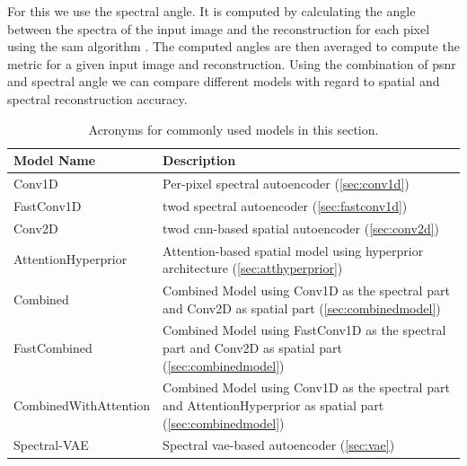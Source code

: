 For this we use the spectral angle. It is computed by calculating the angle between the spectra of the input image and the reconstruction for each pixel using the \ac{sam} algorithm \citep{kruse_spectral_1993}. The computed angles are then averaged to compute the metric for a given input image and reconstruction. Using the combination of \ac{psnr} and spectral angle we can compare different models with regard to spatial and spectral reconstruction accuracy.
\begin{table}
\centering
\caption{Acronyms for commonly used models in this section.}
\begin{tabularx}{\textwidth}{|L|L|}
\hline
Model Name & Description \\
\hline\hline
Conv1D & Per-pixel spectral autoencoder (\autoref{sec:conv1d})\\
\hline
FastConv1D & \Ac{twod} spectral autoencoder (\autoref{sec:fastconv1d})\\
\hline
Conv2D & \Ac{twod} \ac{cnn}-based spatial autoencoder (\autoref{sec:conv2d})\\
\hline
AttentionHyperprior & Attention-based spatial model using hyperprior architecture (\autoref{sec:atthyperprior}) \\
\hline
Combined & Combined Model using Conv1D as the spectral part and Conv2D as spatial part (\autoref{sec:combinedmodel}) \\
\hline
FastCombined & Combined Model using FastConv1D as the spectral part and Conv2D as spatial part (\autoref{sec:combinedmodel}) \\
\hline
CombinedWithAttention & Combined Model using Conv1D as the spectral part and AttentionHyperprior as spatial part (\autoref{sec:combinedmodel}) \\
\hline
Spectral-VAE & Spectral \ac{vae}-based autoencoder (\autoref{sec:vae}) \\
\hline
\end{tabularx}
\label{fig:shortnames}
\end{table}
